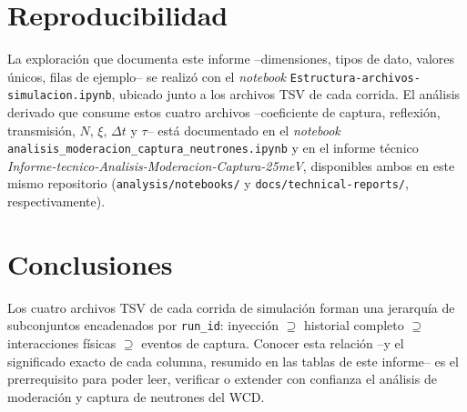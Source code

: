 \documentclass[11pt,a4paper]{article}
\newcommand{\codigo}[1]{\nolinkurl{#1}}
\newcommand{\archivo}[1]{\texttt{#1}} %
\newcommand{\var}[1]{\texttt{#1}}
\begin{document}
\section{Reproducibilidad}

La exploración que documenta este informe --dimensiones, tipos de dato, valores únicos, filas de
ejemplo-- se realizó con el \textit{notebook} \codigo{Estructura-archivos-simulacion.ipynb}, ubicado
junto a los archivos TSV de cada corrida. El análisis derivado que consume estos cuatro archivos
--coeficiente de captura, reflexión, transmisión, $N$, $\xi$, $\Delta t$ y $\tau$-- está documentado
en el \textit{notebook} \codigo{analisis\_moderacion\_captura\_neutrones.ipynb} y en el informe
técnico \textit{Informe-tecnico-Analisis-Moderacion-Captura-25meV}, disponibles ambos en este
mismo repositorio (\archivo{analysis/notebooks/} y \archivo{docs/technical-reports/},
respectivamente).

\section{Conclusiones}

Los cuatro archivos TSV de cada corrida de simulación forman una jerarquía de subconjuntos
encadenados por \var{run\_id}: inyección $\supseteq$ historial completo $\supseteq$ interacciones
físicas $\supseteq$ eventos de captura. Conocer esta relación --y el significado exacto de cada
columna, resumido en las tablas de este informe-- es el prerrequisito para poder leer, verificar o
extender con confianza el análisis de moderación y captura de neutrones del WCD.
\end{document}
